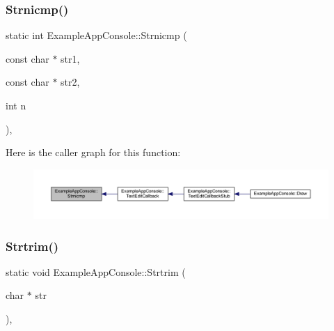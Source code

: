 \subsubsection{\texorpdfstring{Strnicmp()}{Strnicmp()}}
{\footnotesize\ttfamily static int Example\+App\+Console\+::\+Strnicmp (\begin{DoxyParamCaption}\item[{const char $\ast$}]{str1,  }\item[{const char $\ast$}]{str2,  }\item[{int}]{n }\end{DoxyParamCaption})\hspace{0.3cm}{\ttfamily [inline]}, {\ttfamily [static]}}

Here is the caller graph for this function\+:
\nopagebreak
\begin{figure}[H]
\begin{center}
\leavevmode
\includegraphics[width=350pt]{struct_example_app_console_a11bcb7a4b801e5eeb0c098c082fedc25_icgraph}
\end{center}
\end{figure}
\mbox{\label{struct_example_app_console_af9a1afa791f9bd14701bed396b09de1c}} 
\subsubsection{\texorpdfstring{Strtrim()}{Strtrim()}}
{\footnotesize\ttfamily static void Example\+App\+Console\+::\+Strtrim (\begin{DoxyParamCaption}\item[{char $\ast$}]{str }\end{DoxyParamCaption})\hspace{0.3cm}{\ttfamily [inline]}, {\ttfamily [static]}}

